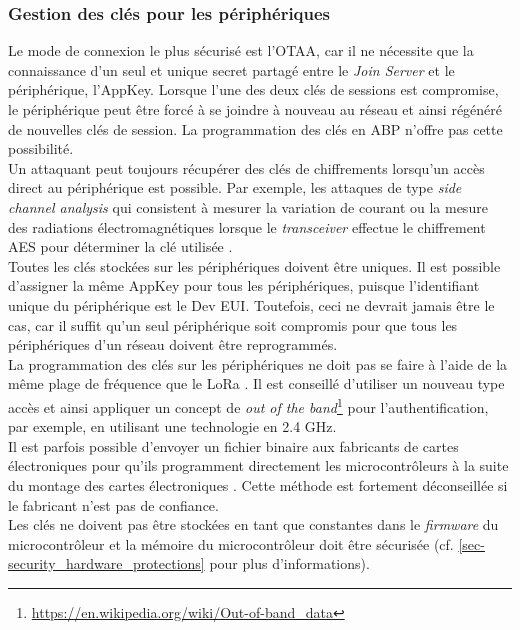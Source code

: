 \subsubsection{Gestion des clés pour les périphériques}


Le mode de connexion le plus sécurisé est l'OTAA, car il ne nécessite que la connaissance d'un seul et unique secret partagé entre le \textit{Join Server} et le périphérique, l'AppKey. Lorsque l'une des deux clés de sessions est compromise, le périphérique peut être forcé à se joindre à nouveau au réseau et ainsi régénéré de nouvelles clés de session. La programmation des clés en ABP n'offre pas cette possibilité.\\

Un attaquant peut toujours récupérer des clés de chiffrements lorsqu'un accès direct au périphérique est possible. Par exemple, les attaques de type \textit{side channel analysis} qui consistent à mesurer la variation de courant ou la mesure des radiations électromagnétiques lorsque le \textit{transceiver} effectue le chiffrement AES pour déterminer la clé utilisée \cite{LoRaSecu3:online}. \\

Toutes les clés stockées sur les périphériques doivent être uniques. Il est possible d'assigner la même AppKey pour tous les périphériques, puisque l'identifiant unique du périphérique est le Dev EUI. Toutefois, ceci ne devrait jamais être le cas, car il suffit qu'un seul périphérique soit compromis pour que tous les périphériques d'un réseau doivent être reprogrammés. \\

La programmation des clés sur les périphériques ne doit pas se faire à l'aide de la même plage de fréquence que le LoRa \cite{ttnvideos_security:online}. Il est conseillé d'utiliser un nouveau type accès et ainsi appliquer un concept de \textit{out of the band}\footnote{\url{https://en.wikipedia.org/wiki/Out-of-band_data}} pour l'authentification, par exemple, en utilisant une technologie en 2.4 GHz. \\

Il est parfois possible d'envoyer un fichier binaire aux fabricants de cartes électroniques pour qu'ils programment directement les microcontrôleurs à la suite du montage des cartes électroniques \cite{ttnvideos_security:online}. Cette méthode est fortement déconseillée si le fabricant n'est pas de confiance. \\
 
Les clés ne doivent pas être stockées en tant que constantes dans le \textit{firmware} du microcontrôleur et la mémoire du microcontrôleur doit être sécurisée (cf. \cref{sec-security_hardware_protections} pour plus d'informations).


